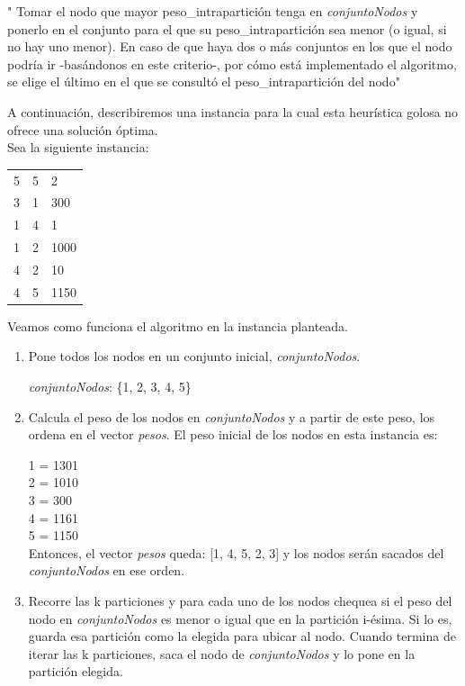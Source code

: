 \documentclass[10pt,a4paper]{article}
\begin{document}
" Tomar el nodo que mayor peso\_intrapartición tenga en \textit{conjuntoNodos} y ponerlo en el conjunto para el que su peso\_intrapartición sea menor (o igual, si no hay uno menor). En caso de que haya dos o más conjuntos en los que el nodo podría ir -basándonos en este criterio-, por cómo está implementado el algoritmo, se elige el último en el que se consultó el peso\_intrapartición del nodo"


A continuación, describiremos una instancia para la cual esta heurística golosa no ofrece una solución óptima.\\

Sea la siguiente instancia:\\

	\begin{tabular}{| l | l | l |}
	\hline
	5 & 5 & 2\\
	3 & 1 & 300\\
	1 & 4 & 1\\
	1 & 2 & 1000\\
	4 & 2 & 10\\
	4 & 5 & 1150\\

	\hline
	\end{tabular}

Veamos como funciona el algoritmo en la instancia planteada. \\

\begin{enumerate}
\item Pone todos los nodos en un conjunto inicial, \textit{conjuntoNodos}.

\textit{conjuntoNodos}: \{1, 2, 3, 4, 5\}

\item Calcula el peso de los nodos en \textit{conjuntoNodos} y a partir de este peso, los ordena en el vector \textit{pesos}. El peso inicial de los nodos en esta instancia es:

1 = 1301\\
2 = 1010\\
3 = 300\\
4 = 1161\\
5 = 1150\\

Entonces, el vector \textit{pesos} queda: [1, 4, 5, 2, 3] y los nodos serán sacados del \textit{conjuntoNodos} en ese orden.\\

\item Recorre las k particiones y para cada uno de los nodos chequea si el peso del nodo en \textit{conjuntoNodos} es menor o igual que en la partición i-ésima. Si lo es, guarda esa partición como la elegida para ubicar al nodo. Cuando termina de iterar las k particiones, saca el nodo de \textit{conjuntoNodos} y lo pone en la partición elegida.
\end{enumerate}
\end{document}
